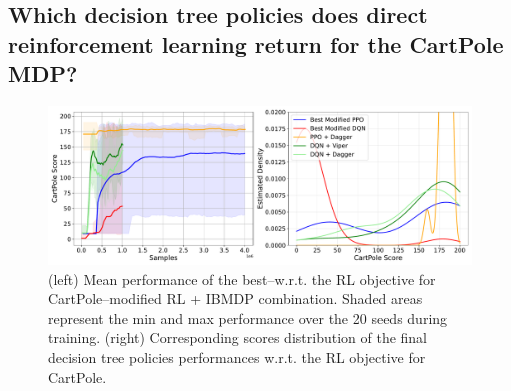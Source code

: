 \subsection{Which decision tree policies does direct reinforcement learning return for the CartPole MDP?}

\begin{figure}
    \centering
    \includegraphics[width=1\textwidth]{images/images_part1/ppo_tree_study.pdf}
    \caption{(left) Mean performance of the best--w.r.t. the RL objective for CartPole--modified RL + IBMDP combination. Shaded areas represent the min and max performance over the 20 seeds during training. (right) Corresponding scores distribution of the final decision tree policies performances w.r.t. the RL objective for CartPole.}\label{fig:ppo-trees}
\end{figure}


